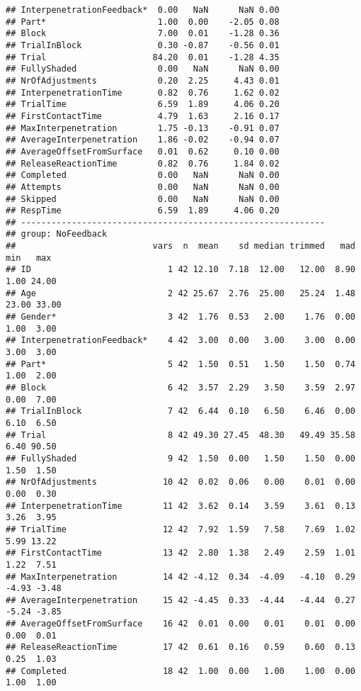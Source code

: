 \documentclass[
]{article}
\begin{document}
\begin{verbatim}
## InterpenetrationFeedback*  0.00   NaN      NaN 0.00
## Part*                      1.00  0.00    -2.05 0.08
## Block                      7.00  0.01    -1.28 0.36
## TrialInBlock               0.30 -0.87    -0.56 0.01
## Trial                     84.20  0.01    -1.28 4.35
## FullyShaded                0.00   NaN      NaN 0.00
## NrOfAdjustments            0.20  2.25     4.43 0.01
## InterpenetrationTime       0.82  0.76     1.62 0.02
## TrialTime                  6.59  1.89     4.06 0.20
## FirstContactTime           4.79  1.63     2.16 0.17
## MaxInterpenetration        1.75 -0.13    -0.91 0.07
## AverageInterpenetration    1.86 -0.02    -0.94 0.07
## AverageOffsetFromSurface   0.01  0.62     0.10 0.00
## ReleaseReactionTime        0.82  0.76     1.84 0.02
## Completed                  0.00   NaN      NaN 0.00
## Attempts                   0.00   NaN      NaN 0.00
## Skipped                    0.00   NaN      NaN 0.00
## RespTime                   6.59  1.89     4.06 0.20
## ------------------------------------------------------------ 
## group: NoFeedback
##                           vars  n  mean    sd median trimmed   mad   min   max
## ID                           1 42 12.10  7.18  12.00   12.00  8.90  1.00 24.00
## Age                          2 42 25.67  2.76  25.00   25.24  1.48 23.00 33.00
## Gender*                      3 42  1.76  0.53   2.00    1.76  0.00  1.00  3.00
## InterpenetrationFeedback*    4 42  3.00  0.00   3.00    3.00  0.00  3.00  3.00
## Part*                        5 42  1.50  0.51   1.50    1.50  0.74  1.00  2.00
## Block                        6 42  3.57  2.29   3.50    3.59  2.97  0.00  7.00
## TrialInBlock                 7 42  6.44  0.10   6.50    6.46  0.00  6.10  6.50
## Trial                        8 42 49.30 27.45  48.30   49.49 35.58  6.40 90.50
## FullyShaded                  9 42  1.50  0.00   1.50    1.50  0.00  1.50  1.50
## NrOfAdjustments             10 42  0.02  0.06   0.00    0.01  0.00  0.00  0.30
## InterpenetrationTime        11 42  3.62  0.14   3.59    3.61  0.13  3.26  3.95
## TrialTime                   12 42  7.92  1.59   7.58    7.69  1.02  5.99 13.22
## FirstContactTime            13 42  2.80  1.38   2.49    2.59  1.01  1.22  7.51
## MaxInterpenetration         14 42 -4.12  0.34  -4.09   -4.10  0.29 -4.93 -3.48
## AverageInterpenetration     15 42 -4.45  0.33  -4.44   -4.44  0.27 -5.24 -3.85
## AverageOffsetFromSurface    16 42  0.01  0.00   0.01    0.01  0.00  0.00  0.01
## ReleaseReactionTime         17 42  0.61  0.16   0.59    0.60  0.13  0.25  1.03
## Completed                   18 42  1.00  0.00   1.00    1.00  0.00  1.00  1.00

\end{verbatim}
\end{document}

